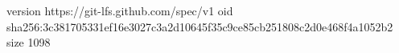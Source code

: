 version https://git-lfs.github.com/spec/v1
oid sha256:3c381705331ef16e3027c3a2d10645f35c9ce85cb251808c2d0e468f4a1052b2
size 1098
